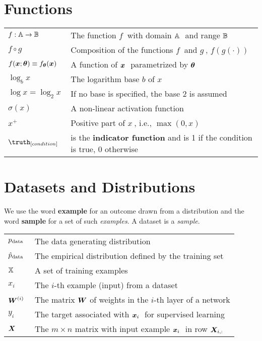 \section*{Functions}
\bgroup{}
\begin{tabular}{>{\centering}p{1.2in}p{4in}}
  \(\displaystyle f: {\mathbb{A}} \rightarrow {\mathbb{B}}~\) & The function \(f~\) with domain  \({\mathbb{A}}~\) and range  \({\mathbb{B}}~\) \\
  \(\displaystyle f \circ g ~\) & Composition of the functions \(f~\) and \(g~\), $f(g(\cdot))$ \\
  \(\displaystyle f({\bm{x}} ; {\bm{\theta}}) \equiv f_{{\bm{\theta}}}({\bm{x}})~\) & A function of  \({\bm{x}}~\) parametrized by  \({\bm{\theta}}~\) \\
  \(\displaystyle \log_b x~\) & The logarithm base \(b\) of \(x~\) \\
  \(\displaystyle \log x=\log_2 x ~\) & If no base is specified, the base 2 is assumed \\

  \(\displaystyle \sigma(x)~\) & A non-linear activation function \\
  \(\displaystyle x^{+}~\) & Positive part of \(x~\), i.e.,  \(\max(0,x)~\) \\
  \(\displaystyle \truth_{[condition]} ~\) & is the \textbf{indicator function} and is 1 if the condition is true, 0 otherwise \\
\end{tabular}
\egroup{}


\section*{Datasets and Distributions}
We use the word \textbf{example} for an outcome drawn from a distribution and the word \textbf{sample} for a set of such \emph{examples}. A dataset is a \emph{sample}.
\bgroup\def\arraystretch{1.8}
\begin{tabular}{>{\centering}p{1.2in}p{4in}}
\(\displaystyle p_{\textrm{data}}~\) & The data generating distribution\\
\(\displaystyle \hat{p}_{\textrm{data}}~\) & The empirical distribution defined by the training set\\
\(\displaystyle {\mathbb{X}}~\) & A set of training examples\\
\(\displaystyle x_i~\) & The  \(i\)-th example (input) from a dataset\\
\(\displaystyle {\bm{W}}^{(i)}~\) & The matrix \({\bm{W}} \) of weights in the \(i\)-th layer of a network\\
\(\displaystyle y_i~\) & The target associated with  \({\bm{x}}_i~\) for supervised learning\\
\(\displaystyle {\bm{X}}~\) & The \(m \times n \) matrix with input example  \({\bm{x}}_i~\) in row  \({\bm{X}}_{i,:}~\) \\
\end{tabular}
\egroup{}

